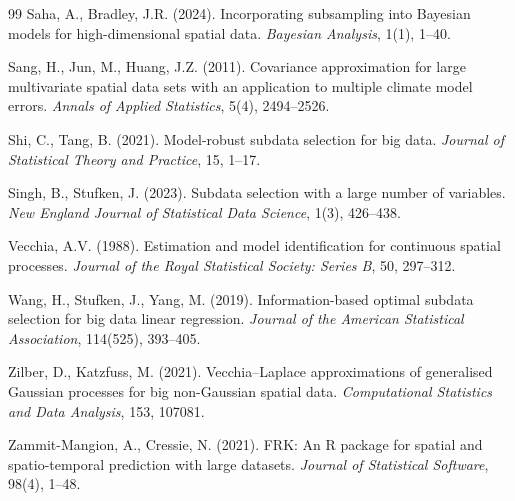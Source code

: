 \documentclass[12pt, a4paper]{article}
\begin{document}
\begin{thebibliography}{99}
Saha, A., Bradley, J.R. (2024).
Incorporating subsampling into Bayesian models for high-dimensional spatial data.
\textit{Bayesian Analysis}, 1(1), 1--40.

Sang, H., Jun, M., Huang, J.Z. (2011).
Covariance approximation for large multivariate spatial data sets with an application
to multiple climate model errors.
\textit{Annals of Applied Statistics}, 5(4), 2494--2526.

Shi, C., Tang, B. (2021).
Model-robust subdata selection for big data.
\textit{Journal of Statistical Theory and Practice}, 15, 1--17.

Singh, B., Stufken, J. (2023).
Subdata selection with a large number of variables.
\textit{New England Journal of Statistical Data Science}, 1(3), 426--438.

Vecchia, A.V. (1988).
Estimation and model identification for continuous spatial processes.
\textit{Journal of the Royal Statistical Society: Series B}, 50, 297--312.

Wang, H., Stufken, J., Yang, M. (2019).
Information-based optimal subdata selection for big data linear regression.
\textit{Journal of the American Statistical Association}, 114(525), 393--405.

Zilber, D., Katzfuss, M. (2021).
Vecchia--Laplace approximations of generalised Gaussian processes for big
non-Gaussian spatial data.
\textit{Computational Statistics and Data Analysis}, 153, 107081.

Zammit-Mangion, A., Cressie, N. (2021).
FRK: An R package for spatial and spatio-temporal prediction with large datasets.
\textit{Journal of Statistical Software}, 98(4), 1--48.

\end{thebibliography}
\end{document}
